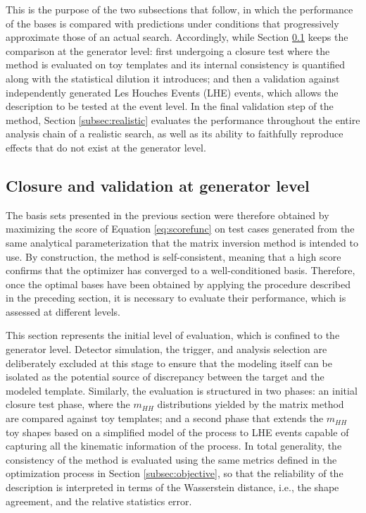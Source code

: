 This is the purpose of the two subsections that follow, in which the performance of the bases is compared with predictions under conditions that progressively approximate those of an actual search. Accordingly, while Section \ref{subsec:closure} keeps the comparison at the generator level: first undergoing a closure test where the method is evaluated on toy templates and its internal consistency is quantified along with the statistical dilution it introduces; and then a validation against independently generated Les Houches Events (LHE) events, which allows the description to be tested at the event level. In the final validation step of the method, Section \ref{subsec:realistic} evaluates the performance throughout the entire analysis chain of a realistic search, as well as its ability to faithfully reproduce effects that do not exist at the generator level.

\subsection{Closure and validation at generator level}
\label{subsec:closure}
%
The basis sets presented in the previous section were therefore obtained by maximizing the score of Equation \ref{eq:scorefunc} on test cases generated from the same analytical parameterization that the matrix inversion method is intended to use. By construction, the method is self-consistent, meaning that a high score confirms that the optimizer has converged to a well-conditioned basis. Therefore, once the optimal bases have been obtained by applying the procedure described in the preceding section, it is necessary to evaluate their performance, which is assessed at different levels.

This section represents the initial level of evaluation, which is confined to the generator level. Detector simulation, the trigger, and analysis selection are deliberately excluded at this stage to ensure that the modeling itself can be isolated as the potential source of discrepancy between the target and the modeled template. Similarly, the evaluation is structured in two phases: an initial closure test phase, where the $m_{HH}$ distributions yielded by the matrix method are compared against toy templates; and a second phase that extends the $m_{HH}$ toy shapes based on a simplified model of the process to LHE events capable of capturing all the kinematic information of the process. In total generality, the consistency of the method is evaluated using the same metrics defined in the optimization process in Section \ref{subsec:objective}, so that the reliability of the description is interpreted in terms of the Wasserstein distance, i.e., the shape agreement, and the relative statistics error.\\


